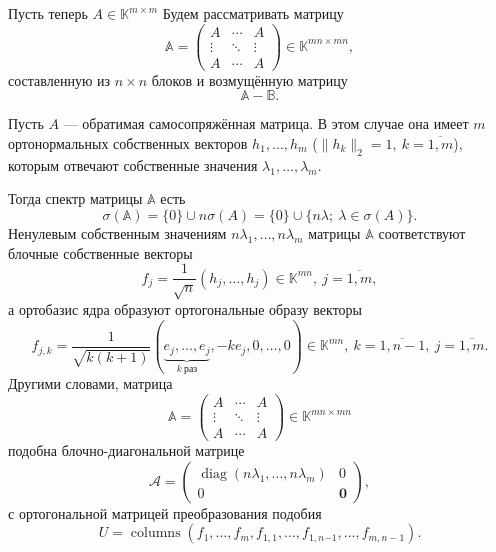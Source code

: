 Пусть теперь \( A\in \mathbb{K}^{m\times m} \)
Будем рассматривать матрицу
\[
    \mathbb{A} =
    \begin{pmatrix}
        A      & \cdots & A \\
        \vdots & \ddots & \vdots \\
        A      & \cdots & A
    \end{pmatrix}
    \in \mathbb{K}^{mn{\times}mn},
    \]
    составленную из \( n\times n \) блоков
    и возмущённую матрицу
\[
    \mathbb{A} - \mathbb{B}.
    \]

\begin{ksvlem}
    Пусть \( A \) --- обратимая самосопряжённая матрица.
    В этом случае она имеет \( m \) ортонормальных
    собственных векторов \( h_1, \ldots, h_m \)
    (\( \|h_k\|_2=1,\ k{=}\overline{1,m} \)),
    которым отвечают собственные значения \( \lambda_1, \ldots, \lambda_m \).

    Тогда спектр матрицы \( \mathbb{A} \) есть
    \[
        \sigma(\mathbb{A}) = \{0\} \cup n\sigma(A)
        = \{ 0 \} \cup \{ n\lambda;\ \lambda\in\sigma(A) \}.
        \]
    Ненулевым собственным значениям \( n\lambda_1, \ldots, n\lambda_m \)
    матрицы \( \mathbb{A} \)
    соответствуют блочные собственные векторы
    \[
        f_j = \frac{1}{\sqrt{n}}(h_j, \ldots, h_j)\in\mathbb{K}^{mn},
        \ j{=}\overline{1,m},
       \]
    а ортобазис ядра образуют ортогональные образу
    векторы
    \[
        f_{j,k} =
        \frac{1}{\sqrt{k(k+1)}}
        (\underbrace{e_j,\ldots,e_j}_{k\ \text{раз}}, -ke_j, 0, \ldots, 0)\in\mathbb{K}^{mn},
        \ k{=}\overline{1,n-1},
        \ j{=}\overline{1,m}.
        \]
    Другими словами, матрица
    \[
        \mathbb{A} = 
        \begin{pmatrix}
            A      & \cdots & A \\
            \vdots & \ddots & \vdots \\
            A      & \cdots & A
        \end{pmatrix}
        \in\mathbb{K}^{mn{\times}mn}
        \]
    подобна блочно-диагональной матрице
    \[
        \mathcal{A} =
        \left(\begin{array}{c|c}
            \operatorname{diag}(n\lambda_1,\ldots,n\lambda_m) & 0 \\ \hline
            0 & \mathbf{0}
        \end{array}\right),
        \]
    с ортогональной матрицей преобразования подобия
    \[
        U = \operatorname{columns}
        \left(f_1, \ldots, f_m, f_{1,1}, \ldots, f_{1,n{-1}}, \ldots, f_{m,n{-}1}\right).
        \]
\end{ksvlem}

